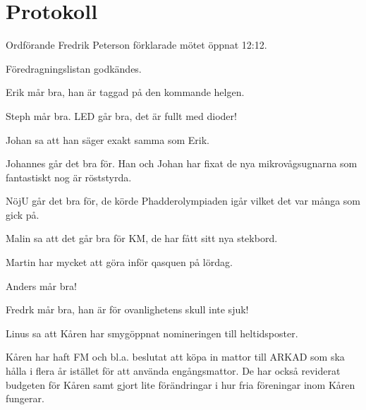 \documentclass[10pt]{article}
\def\mo{Fredrik Peterson}
\begin{document}
\section*{Protokoll}
\begin{paragrafer}
Ordförande {\mo} förklarade mötet öppnat 12:12.

\valavmo

\valavms

\tosg

\ingaadj

\valavj

Föredragningslistan godkändes.


\begin{fyllnadsval} %
\end{fyllnadsval}

\begin{paragrafer}
Erik mår bra, han är taggad på den kommande helgen.

Steph mår bra. LED går bra, det är fullt med dioder!

Johan sa att han säger exakt samma som Erik.

Johannes går det bra för. Han och Johan har fixat de nya mikrovågsugnarna som fantastiskt nog är röststyrda.

NöjU går det bra för, de körde Phadderolympiaden igår vilket det var många som gick på.

Malin sa att det går bra för KM, de har fått sitt nya stekbord.

Martin har mycket att göra inför qasquen på lördag.

Anders mår bra!

Fredrk mår bra, han är för ovanlighetens skull inte sjuk!

Linus sa att Kåren har smygöppnat nomineringen till heltidsposter.

Kåren har haft FM och bl.a. beslutat att köpa in mattor till ARKAD som ska hålla i flera år istället för att använda engångsmattor. De har också reviderat budgeten för Kåren samt gjort lite förändringar i hur fria föreningar inom Kåren fungerar.


\end{paragrafer}
\end{paragrafer}
\end{document}
